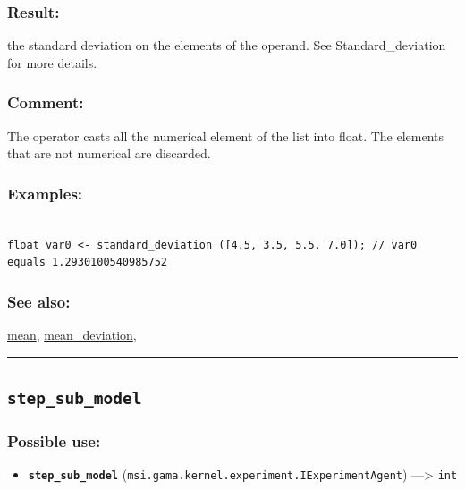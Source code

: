 \documentclass[]{book}
\providecommand{\tightlist}{%
  \setlength{\itemsep}{0pt}\setlength{\parskip}{0pt}}
\theoremstyle{definition}
\theoremstyle{definition}
\theoremstyle{definition}
\theoremstyle{remark}
\begin{document}
\subsubsection{Result:}\label{result-485}

the standard deviation on the elements of the operand. See
Standard\_deviation for more details.

\subsubsection{Comment:}\label{comment-94}

The operator casts all the numerical element of the list into float. The
elements that are not numerical are discarded.

\subsubsection{Examples:}\label{examples-350}

\begin{verbatim}
 
float var0 <- standard_deviation ([4.5, 3.5, 5.5, 7.0]); // var0 equals 1.2930100540985752
\end{verbatim}

\subsubsection{See also:}\label{see-also-197}

\href{operators-i-to-m.html\#mean}{mean},
\href{operators-i-to-m.html\#mean_deviation}{mean\_deviation},

\begin{center}\rule{0.5\linewidth}{\linethickness}\end{center}

\subsection{\texorpdfstring{\texttt{step\_sub\_model}}{step\_sub\_model}}\label{step_sub_model}

\subsubsection{Possible use:}\label{possible-use-503}

\begin{itemize}
\tightlist
\item
  \textbf{\texttt{step\_sub\_model}}
  (\texttt{msi.gama.kernel.experiment.IExperimentAgent})
  ---\textgreater{} \texttt{int}
\end{itemize}
\end{document}
